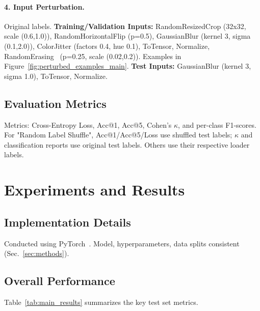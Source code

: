 \documentclass[10pt,twocolumn,letterpaper]{article}
\begin{document}
\paragraph{4. Input Perturbation.}
Original labels.
\textbf{Training/Validation Inputs:} RandomResizedCrop (32x32, scale (0.6,1.0)), RandomHorizontalFlip (p=0.5), GaussianBlur (kernel 3, sigma (0.1,2.0)), ColorJitter (factors 0.4, hue 0.1), ToTensor, Normalize, RandomErasing~\cite{DBLP:conf/aaai/Zhong0KL020} (p=0.25, scale (0.02,0.2)). Examples in Figure~\ref{fig:perturbed_examples_main}.
\textbf{Test Inputs:} GaussianBlur (kernel 3, sigma 1.0), ToTensor, Normalize.

\subsection{Evaluation Metrics}
Metrics: Cross-Entropy Loss, Acc@1, Acc@5, Cohen's $\kappa$, and per-class F1-scores.
For "Random Label Shuffle", Acc@1/Acc@5/Loss use shuffled test labels; $\kappa$ and classification reports use original test labels. Others use their respective loader labels.

\section{Experiments and Results} %
\label{sec:experiments_results}

\subsection{Implementation Details}
Conducted using PyTorch~\cite{DBLP:conf/nips/PaszkeGMLBCKLGA19}. Model, hyperparameters, data splits consistent (Sec.~\ref{sec:methods}).

\subsection{Overall Performance}
Table~\ref{tab:main_results} summarizes the key test set metrics.
\end{document}
